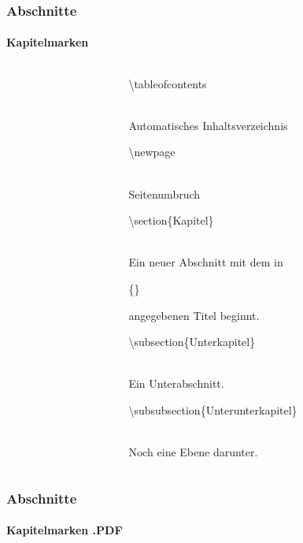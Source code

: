 \begin{frame}
\frametitle{Abschnitte}
\framesubtitle{Kapitelmarken}
\begin{columns}
\begin{column}{0.5\textwidth}
\begin{ttfamily}\footnotesize

\end{ttfamily}
\end{column}
\begin{column}{0.5\textwidth}

\begin{ttfamily}\color{nounibaredI}\textbackslash tableofcontents\color{black}\end{ttfamily}\\
Automatisches Inhaltsverzeichnis\\[3mm]
\begin{ttfamily}\color{nounibaredI}\textbackslash newpage\color{black}\end{ttfamily}\\
Seitenumbruch\\[3mm]
\begin{ttfamily}\color{unibablueI}\textbackslash section\color{black}\{Kapitel\}\end{ttfamily}\\
Ein neuer Abschnitt mit dem in \begin{ttfamily}\{\}\end{ttfamily} angegebenen Titel
beginnt.\\[3mm]
\begin{ttfamily}\color{unibablueI}\textbackslash subsection\color{black}\{Unterkapitel\}\end{ttfamily}\\
Ein Unterabschnitt.\\[3mm]
\begin{ttfamily}\color{unibablueI}\textbackslash subsubsection\color{black}\{Unterunterkapitel\}\end{ttfamily}\\
Noch eine Ebene darunter.\\
\end{column}
\end{columns}
\end{frame}


\begin{frame}
\frametitle{Abschnitte}
\framesubtitle{Kapitelmarken .PDF}
\begin{columns}
\begin{column}{0.5\textwidth}
\begin{ttfamily}\footnotesize

\end{ttfamily}
\end{column}
\begin{column}{0.5\textwidth}
\end{column}
\end{columns}
\end{frame}

